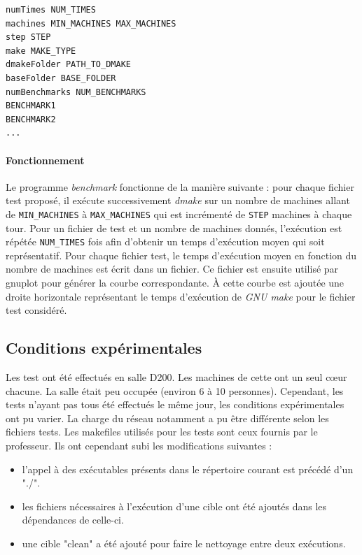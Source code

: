 \documentclass[a4paper,12pt,twoside]{article}
\begin{document}
\begin{verbatim}
numTimes NUM_TIMES
machines MIN_MACHINES MAX_MACHINES
step STEP
make MAKE_TYPE
dmakeFolder PATH_TO_DMAKE
baseFolder BASE_FOLDER
numBenchmarks NUM_BENCHMARKS
BENCHMARK1
BENCHMARK2
...
\end{verbatim}

\paragraph{Fonctionnement}

Le programme \emph{benchmark} fonctionne de la manière suivante : pour
chaque fichier test proposé, il exécute successivement \emph{dmake} sur un nombre de
machines allant de \texttt{MIN\_MACHINES} à \texttt{MAX\_MACHINES}
qui est incrémenté de \texttt{STEP} machines à chaque tour. Pour un
fichier de test et un nombre de machines donnés, l'exécution est
répétée \texttt{NUM\_TIMES} fois afin d'obtenir un temps d'exécution moyen
qui soit représentatif. 
Pour chaque fichier test, le temps d'exécution moyen en fonction du
nombre de machines est écrit dans un fichier. Ce fichier est ensuite
utilisé par gnuplot pour générer la courbe correspondante. À cette
courbe est ajoutée une droite horizontale représentant le temps
d'exécution de \emph{GNU make} pour le fichier test considéré. 

\subsection{Conditions expérimentales}

Les test ont été effectués en salle D200. Les machines de cette ont un
seul cœur chacune. La salle était peu occupée
(environ 6 à 10 personnes). Cependant, les tests n'ayant pas tous été
effectués le même jour, les conditions expérimentales ont pu
varier. La charge du réseau notamment a pu être différente selon les
fichiers tests. Les makefiles utilisés pour les tests sont ceux
fournis par le professeur. Ils ont cependant subi les modifications
suivantes : 
\begin{itemize}
\item l'appel à des exécutables présents dans le répertoire courant est
  précédé d'un "./".
\item les fichiers nécessaires à l'exécution d'une cible ont été
  ajoutés dans les dépendances de celle-ci.
\item une cible "clean" a été ajouté pour faire le nettoyage entre deux exécutions.
\end{itemize}
\end{document}
